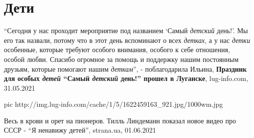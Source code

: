  
 
 
 
 
\chapter{Дети}

\enquote{Сегодня у нас проходит мероприятие под названием \enquote{Самый
\emph{детский} день!}. Мы его так назвали, потому что в этот день вспоминают о
всех \emph{детках}, а у нас \emph{детки} особенные, которые требуют особого
внимания, особого к себе отношения, особой любви. Спасибо огромное за помощь и
поддержку нашим постоянным друзьям, которые помогают нашим \emph{деткам}}, -
поблагодарила Ильина, \textbf{Праздник для особых \emph{детей} \enquote{Самый
\emph{детский} день!} прошел в Луганске}, lug-info.com, 31.05.2021

\ifcmt
  pic http://img.lug-info.com/cache/1/5/1622459163_921.jpg/1000wm.jpg
\fi

Весь в крови и орет на пионеров. Тилль Линдеманн показал новое видео про СССР -
\enquote{Я ненавижу детей}, strana.ua, 01.06.2021
